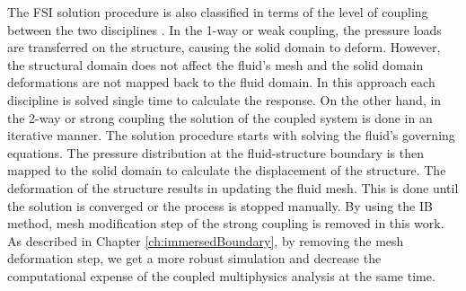 The FSI solution procedure is also classified in terms of the level of coupling between the two disciplines \cite{hu2001direct}. In the 1-way or weak coupling, the pressure loads are transferred on the structure, causing the solid domain to deform. However, the structural domain does not affect the fluid's mesh and the solid domain deformations are not mapped back to the fluid domain. In this approach each discipline is solved single time to calculate the response. On the other hand, in the 2-way or strong coupling the solution of the coupled system is done in an iterative manner. The solution procedure starts with solving the fluid's governing equations. The pressure distribution at the fluid-structure boundary is then mapped to the solid domain to calculate the displacement of the structure. The deformation of the structure results in updating the fluid mesh. This is done until the solution is converged or the process is stopped manually. By using the IB method, mesh modification step of the strong coupling is removed in this work. As described in Chapter \ref{ch:immersedBoundary}, by removing the mesh deformation step, we get a more robust simulation and decrease the computational expense of the coupled multiphysics analysis at the same time.
